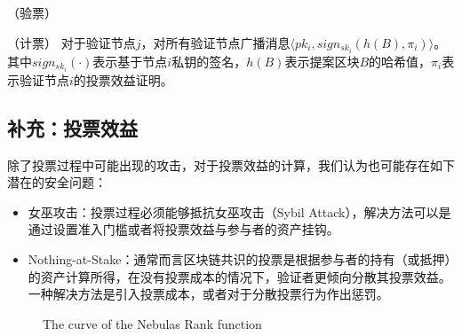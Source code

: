 \begin{definition}
	（验票）
\end{definition}

\begin{definition}
（计票） 对于验证节点$j$，对所有验证节点广播消息$\langle pk_i,sign_{sk_i}(h(B),\pi_i) \rangle$。其中$sign_{sk_i}(\cdot)$表示基于节点$i$私钥的签名，$h(B)$表示提案区块$B$的哈希值，$\pi_i$表示验证节点$i$的投票效益证明。
\end{definition}


\subsection{补充：投票效益}
除了投票过程中可能出现的攻击，对于投票效益的计算，我们认为也可能存在如下潜在的安全问题：

\begin{itemize}
	\item 女巫攻击：投票过程必须能够抵抗女巫攻击（Sybil Attack），解决方法可以是通过设置准入门槛或者将投票效益与参与者的资产挂钩。
	\item Nothing-at-Stake：通常而言区块链共识的投票是根据参与者的持有（或抵押）的资产计算所得，在没有投票成本的情况下，验证者更倾向分散其投票效益。一种解决方法是引入投票成本，或者对于分散投票行为作出惩罚\cite{buterin2017casper}。	
\end{itemize}


\begin{figure}
\centering
{}
\caption{The curve of the Nebulas Rank function \label{fig-nr}}
\end{figure}